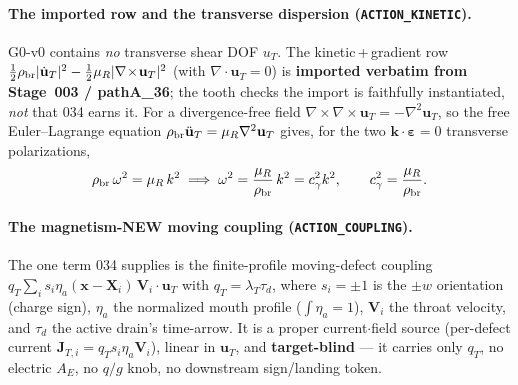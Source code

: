 \paragraph{The imported row and the transverse dispersion (\texttt{ACTION\_KINETIC}).}
G0-v0 contains \emph{no} transverse shear DOF \(u_T\). The kinetic\,+\,gradient row
\(\tfrac12\rho_{\rm br}|\dot{\mathbf u}_T|^2-\tfrac12\mu_R|\nabla\!\times\!\mathbf u_T|^2\)
(with \(\nabla\!\cdot\!\mathbf u_T=0\)) is \textbf{imported verbatim from Stage~003 /
pathA\_36}; the tooth checks the import is faithfully instantiated, \emph{not} that
034 earns it. For a divergence-free field
\(\nabla\!\times\!\nabla\!\times\!\mathbf u_T=-\nabla^2\mathbf u_T\), so the free
Euler--Lagrange equation \(\rho_{\rm br}\ddot{\mathbf u}_T=\mu_R\nabla^2\mathbf u_T\)
gives, for the two \(\mathbf k\!\cdot\!\boldsymbol\varepsilon=0\) transverse
polarizations,
\[
  \rho_{\rm br}\,\omega^2=\mu_R\,k^2
  \;\Longrightarrow\;
  \omega^2=\frac{\mu_R}{\rho_{\rm br}}\,k^2=c_\gamma^2k^2,
  \qquad c_\gamma^2=\frac{\mu_R}{\rho_{\rm br}}.
\]

\paragraph{The magnetism-NEW moving coupling (\texttt{ACTION\_COUPLING}).}
The one term 034 supplies is the finite-profile moving-defect coupling
\(q_T\sum_i s_i\eta_a(\mathbf x-\mathbf X_i)\,\mathbf V_i\!\cdot\!\mathbf u_T\) with
\(q_T=\lambda_T\tau_d\), where \(s_i=\pm1\) is the \(\pm w\) orientation (charge
sign), \(\eta_a\) the normalized mouth profile (\(\int\eta_a=1\)), \(\mathbf V_i\)
the throat velocity, and \(\tau_d\) the active drain's time-arrow. It is a proper
current\(\cdot\)field source (per-defect current \(\mathbf J_{T,i}=q_T s_i\eta_a\mathbf V_i\)),
linear in \(\mathbf u_T\), and \textbf{target-blind} --- it carries only \(q_T\), no
electric \(A_E\), no \(q/g\) knob, no downstream sign/landing token.


